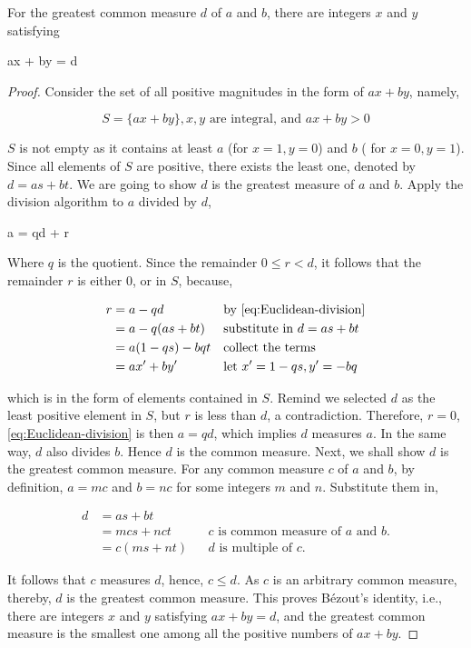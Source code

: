 \documentclass[b5paper]{article}
\begin{document}
\begin{theorem}
For the greatest common measure $d$ of $a$ and $b$, there are integers $x$ and $y$ satisfying

\be
ax + by = d
\label{eq:bezouts-identity}
\ee
\end{theorem}

\begin{proof}
Consider the set of all positive magnitudes in the form of $ax + by$, namely,

\[
S = \{ ax + by \}, x, y \text{ are integral, and } ax + by > 0
\]

$S$ is not empty as it contains at least $a$ (for $x = 1, y = 0$) and $b$ ( for $x = 0, y = 1$). Since all elements of $S$ are positive, there exists the least one, denoted by $d = as + bt$. We are going to show $d$ is the greatest measure of $a$ and $b$. Apply the division algorithm to $a$ divided by $d$,

\be
a = qd + r
\label{eq:Euclidean-division}
\ee

Where $q$ is the quotient. Since the remainder $0 \leq r < d$, it follows that the remainder $r$ is either 0, or in $S$, because,

\begin{align*}
r & = a - qd          && \text{by \cref{eq:Euclidean-division}} \\
  & = a - q(as + bt)  && \text{substitute in }d = as + bt \\
  & = a(1 - qs) - bqt && \text{collect the terms} \\
  & = ax' + by'       && \text{let }x' = 1 - qs, y' = -bq
\end{align*}

which is in the form of elements contained in $S$. Remind we selected $d$ as the least positive element in $S$, but $r$ is less than $d$, a contradiction. Therefore, $r = 0$, \cref{eq:Euclidean-division} is then $a = qd$, which implies $d$ measures $a$. In the same way, $d$ also divides $b$. Hence $d$ is the common measure. Next, we shall show $d$ is the greatest common measure. For any common measure $c$ of $a$ and $b$, by definition, $a = mc$ and $b = nc$ for some integers $m$ and $n$. Substitute them in,

\begin{align*}
d & = as + bt    \\
  & = mcs + nct  && c\text{ is common measure of $a$ and $b$.} \\
  & = c(ms + nt) && d\text{ is multiple of $c$.}
\end{align*}

It follows that $c$ measures $d$, hence, $c \leq d$. As $c$ is an arbitrary common measure, thereby, $d$ is the greatest common measure. This proves Bézout's identity, i.e., there are integers $x$ and $y$ satisfying $ax + by = d$, and the greatest common measure is the smallest one among all the positive numbers of $ax + by$.
\end{proof}
\end{document}
